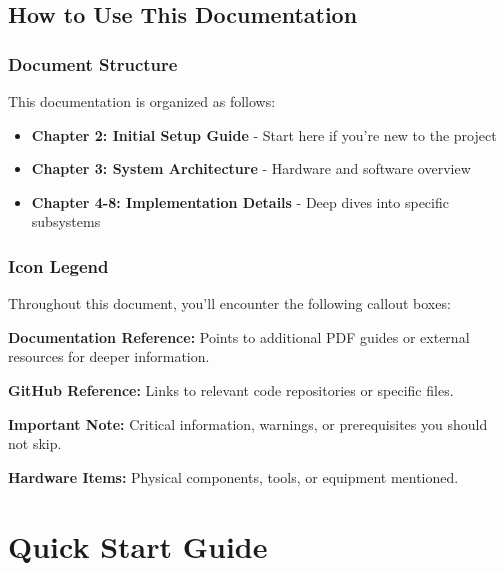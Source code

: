 \documentclass[12pt,a4paper]{report}
\begin{document}
\section{How to Use This Documentation}

\subsection{Document Structure}
This documentation is organized as follows:
\begin{itemize}
    \item \textbf{Chapter 2: Initial Setup Guide} - Start here if you're new to the project
    \item \textbf{Chapter 3: System Architecture} - Hardware and software overview
    \item \textbf{Chapter 4-8: Implementation Details} - Deep dives into specific subsystems
\end{itemize}

\subsection{Icon Legend}
Throughout this document, you'll encounter the following callout boxes:

\begin{docref}
\textbf{Documentation Reference:} Points to additional PDF guides or external resources for deeper information.
\end{docref}

\begin{gitref}
\textbf{GitHub Reference:} Links to relevant code repositories or specific files.
\end{gitref}

\begin{important}
\textbf{Important Note:} Critical information, warnings, or prerequisites you should not skip.
\end{important}

\begin{hardware}
\textbf{Hardware Items:} Physical components, tools, or equipment mentioned.
\end{hardware}



\chapter{Quick Start Guide}
\end{document}
